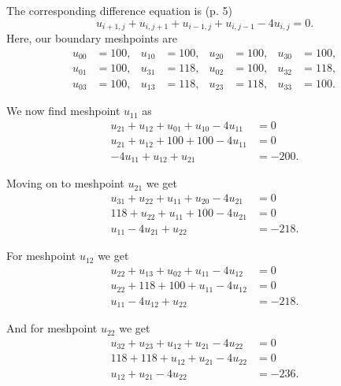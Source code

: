 \begin{derivation}
  The corresponding difference equation is (p. 5)
  \begin{equation*}
    u_{i+1, j} + u_{i, j+1} + u_{i-1, j} + u_{i,j-1} - 4u_{i,j}= 0 
  .\end{equation*}
  Here, our boundary meshpoints are
  \begin{align*}
    u_{00} &= 100, & u_{10} &= 100, & u_{20} &= 100, & u_{30} &= 100, \\
    u_{01} &= 100, & u_{31} &= 118, & u_{02} &= 100, & u_{32} &= 118, \\
    u_{03} &= 100, & u_{13} &= 118, & u_{23} &= 118, & u_{33} &= 100
  .\end{align*}

  We now find meshpoint $u_{11}$ as
  \begin{align*}
    u_{21} + u_{12} + u_{01} + u_{10} - 4 u_{11} &= 0 \\
    u_{21} + u_{12} + 100 + 100 - 4u_{11} &= 0 \\
    -4 u_{11} + u_{12} + u_{21} &= -200
  .\end{align*}

  Moving on to meshpoint $u_{21}$ we get
  \begin{align*}
    u_{31} + u_{22} + u_{11} + u_{20} - 4u_{21} &= 0 \\
    118 + u_{22} + u_{11} + 100 - 4 u _{21} &= 0 \\
    u_{11} - 4u_{21} + u_{22} &= -218
  .\end{align*}

  For meshpoint $u_{12}$ we get
  \begin{align*}
    u_{22} + u_{13} + u_{02} + u_{11} - 4u_{12} &= 0 \\
    u_{22} + 118 + 100 + u_{11} - 4u_{12} &= 0 \\
    u_{11} - 4u_{12} + u_{22} &= -218
  .\end{align*}

  And for meshpoint $u_{22}$ we get
  \begin{align*}
    u_{32} + u_{23} + u_{12} + u_{21} - 4u_{22} &= 0 \\
    118 + 118 + u_{12} + u_{21} - 4u_{22} &= 0 \\
    u_{12} + u_{21} - 4u_{22} &= -236
  .\end{align*}
\end{derivation}

